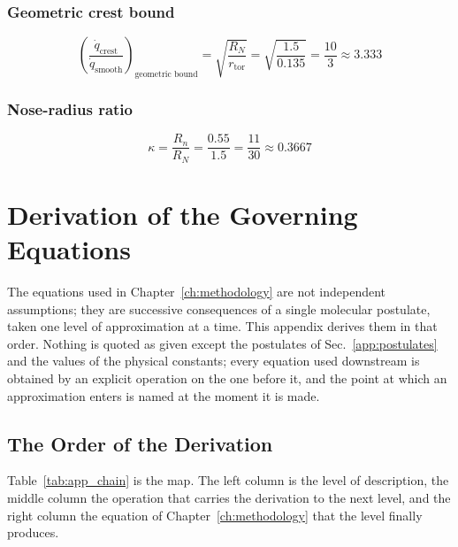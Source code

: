 \subsection{Geometric crest bound}
\begin{equation}
    \left(\frac{\dot q_{\text{crest}}}{\dot q_{\text{smooth}}}\right)_{\text{geometric bound}}
    = \sqrt{\frac{R_N}{r_{\text{tor}}}}
    = \sqrt{\frac{1.5}{0.135}}
    = \frac{10}{3} \approx 3.333
\end{equation}

\subsection{Nose-radius ratio}
\begin{equation}
    \kappa = \frac{R_n}{R_N} = \frac{0.55}{1.5} = \frac{11}{30} \approx 0.3667
\end{equation}

\chapter{Derivation of the Governing Equations}
\label{app:governing_derivations}

The equations used in Chapter~\ref{ch:methodology} are not independent assumptions; they are successive consequences of a single molecular postulate, taken one level of approximation at a time. This appendix derives them in that order. Nothing is quoted as given except the postulates of Sec.~\ref{app:postulates} and the values of the physical constants; every equation used downstream is obtained by an explicit operation on the one before it, and the point at which an approximation enters is named at the moment it is made.

\section{The Order of the Derivation}
\label{app:order}

Table~\ref{tab:app_chain} is the map. The left column is the level of description, the middle column the operation that carries the derivation to the next level, and the right column the equation of Chapter~\ref{ch:methodology} that the level finally produces.

